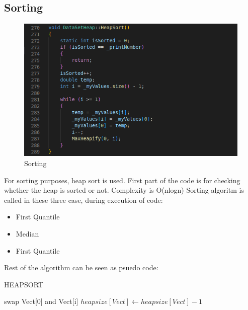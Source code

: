 \documentclass[a4paper, 12pt, titlepage]{article}
\begin{document}
\subsection{Sorting}
\begin{figure}[H]
	\centering
	\label{fig:sort}
	\includegraphics[width=.90\textwidth]{Heap Sort.png} %
        \caption{Sorting}
\end{figure}
For sorting purposes, heap sort is used. First part of the code is for checking whether the heap is sorted or not.
Complexity is O(nlogn)
Sorting algoritm is called in these three case, during execution of code: 
\begin{itemize}
	\item First Quantile
	\item Median
	\item First Quantile
\end{itemize}
Rest of the algorithm can be seen as psuedo code:

\begin{algorithm}[H]
	\caption{HEAPSORT}
	\label{algo:dfs}
	\begin{algorithmic}
        \State swap Vect[0] and Vect[i]
		\State $heapsize[Vect] \gets heapsize[Vect]-1$
		\State{}
	\EndFor
	\end{algorithmic}
\end{algorithm}
\newpage
\end{document}
